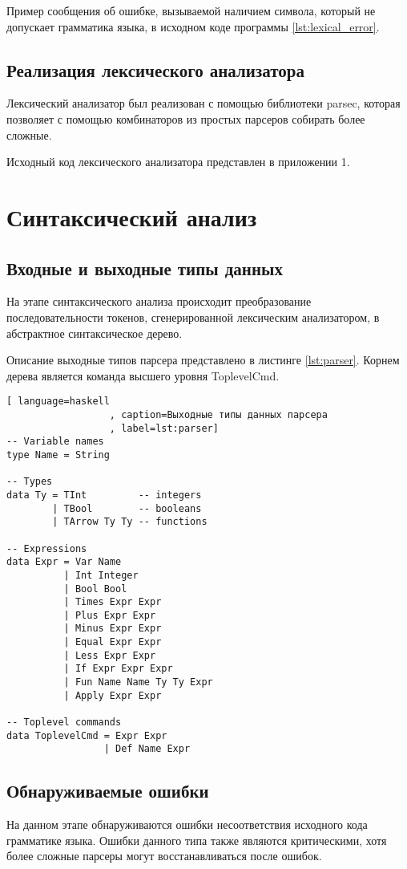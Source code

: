 \documentclass[a4paper,12pt]{article}
\numberwithin{equation}{section}
\begin{document}
Пример сообщения об ошибке, вызываемой наличием символа, который не
допускает грамматика языка, в исходном коде программы \ref{lst:lexical_error}.

\subsection{Реализация лексического анализатора}
Лексический анализатор был реализован с помощью библиотеки parsec,
которая позволяет с помощью комбинаторов из простых парсеров собирать
более сложные.

Исходный код лексического анализатора представлен в приложении 1.

\section{Синтаксический анализ}
\subsection{Входные и выходные типы данных}
На этапе синтаксического анализа происходит преобразование
последовательности токенов, сгенерированной лексическим анализатором,
в абстрактное синтаксическое дерево.


Описание выходные типов парсера представлено в листинге \ref{lst:parser}. 
Корнем дерева является команда высшего уровня ToplevelCmd.

\begin{lstlisting}[ language=haskell
                  , caption=Выходные типы данных парсера
                  , label=lst:parser]
-- Variable names
type Name = String

-- Types
data Ty = TInt         -- integers
        | TBool        -- booleans
        | TArrow Ty Ty -- functions

-- Expressions
data Expr = Var Name
          | Int Integer
          | Bool Bool
          | Times Expr Expr
          | Plus Expr Expr
          | Minus Expr Expr
          | Equal Expr Expr
          | Less Expr Expr
          | If Expr Expr Expr
          | Fun Name Name Ty Ty Expr
          | Apply Expr Expr

-- Toplevel commands
data ToplevelCmd = Expr Expr
                 | Def Name Expr
\end{lstlisting}

\subsection{Обнаруживаемые ошибки}
На данном этапе обнаруживаются ошибки несоответствия исходного кода
грамматике языка. Ошибки данного типа также являются критическими,
хотя более сложные парсеры могут восстанавливаться после ошибок.
\end{document}
